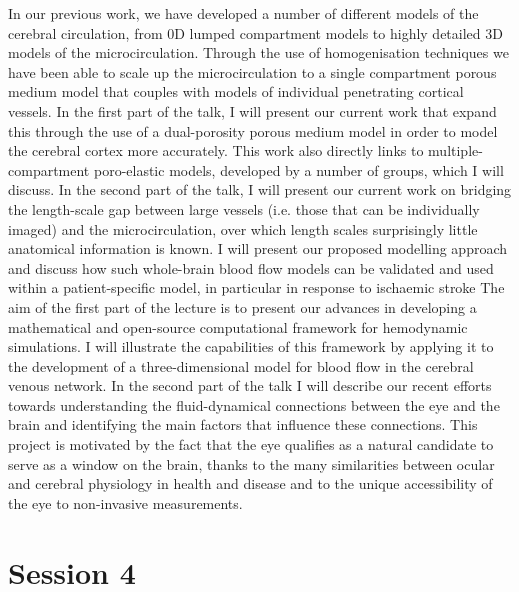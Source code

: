 \documentclass{article}
\begin{document}
{
In our previous work, we have developed a number of different models of the cerebral circulation, from 0D lumped compartment models to highly detailed 3D models of the microcirculation. Through the use of homogenisation techniques we have been able to scale up the microcirculation to a single compartment porous medium model that couples with models of individual penetrating cortical vessels. In the first part of the talk, I will present our current work that expand this through the use of a dual-porosity porous medium model in order to model the cerebral cortex more accurately. This work also directly links to multiple-compartment poro-elastic models, developed by a number of groups, which I will discuss. In the second part of the talk, I will present our current work on bridging the length-scale gap between large vessels (i.e. those that can be individually imaged) and the microcirculation, over which length scales surprisingly little anatomical information is known. I will present our proposed modelling approach and discuss how such whole-brain blood flow models can be validated and used within a patient-specific model, in particular in response to ischaemic stroke
}
{
The aim of the first part of the lecture is to present our advances in
developing a mathematical and open-source computational framework for 
hemodynamic simulations. I will illustrate the capabilities of this 
framework by applying it to the development of a three-dimensional 
model for blood flow in the cerebral venous network. In the second 
part of the talk I will describe our recent efforts towards 
understanding the fluid-dynamical connections between the eye and the 
brain and identifying the main factors that influence these 
connections. This project is motivated by the fact that the eye 
qualifies as a natural candidate to serve as a window on the brain, 
thanks to the many similarities between ocular and cerebral physiology 
in health and disease and to the unique accessibility of the eye to 
non-invasive measurements.
}


\section*{Session 4}
\end{document}
